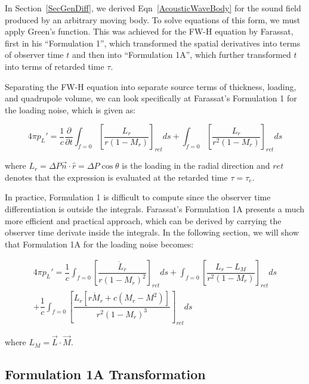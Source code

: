 \documentclass[]{aiaa-tc}%
\begin{document}
In Section~\ref{SecGenDiff}, we derived Eqn~\ref{AcousticWaveBody} for the sound field produced by an arbitrary moving body.  To solve equations of this form, we must apply Green's function.  This was achieved for the FW-H equation by Farassat, first in his ``Formulation 1'', which transformed the spatial derivatives into terms of observer time $t$ and then into ``Formulation 1A'', which further transformed $t$ into terms of retarded time $\tau$.

Separating the FW-H equation into separate source terms of thickness, loading, and quadrupole volume, we can look specifically at Farassat’s Formulation 1 for the loading noise, which is given as:

\begin{equation} \label{FarassatForm1Loading}
\boxed{4\pi p_{L}' = \dfrac{1}{c} \dfrac{\partial}{\partial t}
      \int_{f=0} \left[ \dfrac{L_r}{r   (1 - M_r)} \right]_{ret} ds
    + \int_{f=0} \left[ \dfrac{L_r}{r^2 (1 - M_r)} \right]_{ret} ds}
\end{equation}


\noindent where $L_r = \Delta P \vec{n} \cdot \hat{r} = \Delta P \cos\theta$ is the loading in the radial direction and $ret$ denotes that the expression is evaluated at the retarded time $\tau=\tau_e$.

In practice, Formulation 1 is difficult to compute since the observer time differentiation is outside the integrals. Farassat's Formulation 1A presents a much more efficient and practical approach, which can be derived by carrying the observer time derivate inside the integrals. In the following section, we will show that Formulation 1A for the loading noise becomes:

\begin{equation} \label{FarassatForm1ALoadingEx}
\begin{split}
4\pi p_{L}' = \dfrac{1}{c}
      \int_{f=0} \left[ \dfrac{\dot{L}_r}{r (1 - M_r)^2} \right]_{ret} ds
    + \int_{f=0} \left[ \dfrac{L_r - L_M}{r^2 (1 - M_r)} \right]_{ret} ds \\
+ \dfrac{1}{c} \int_{f=0} \left[
    \dfrac{L_r[r \dot{M}_r + c(M_r - M^2)] }{r^2 (1 - M_r)^3} \right]_{ret} ds
\end{split}
\end{equation}

\noindent where $L_M = \vec{L} \cdot \vec{M} $.

\subsection{Formulation 1A Transformation}
\end{document}
